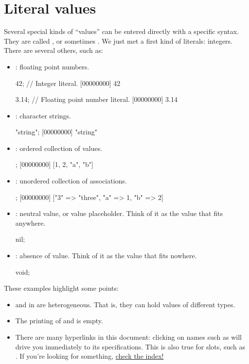 \section{Literal values}

Several special kinds of ``values'' can be entered directly with a specific
syntax.  They are called , or sometimes .
We just met a first kind of literals: integers.  There are several others,
such as:

\begin{itemize}
\item {}: floating point numbers.
\begin{urbiscript}
42; // Integer literal.
[00000000] 42

3.14; // Floating point number literal.
[00000000] 3.14
\end{urbiscript}

\item {}: character strings.
\begin{urbiscript}
"string";
[00000000] "string"
\end{urbiscript}

\item {}: ordered collection of values.
\begin{urbiscript}
[1, 2, "a", "b"];
[00000000] [1, 2, "a", "b"]
\end{urbiscript}

\item {}: unordered collection of
  associations.
\begin{urbiscript}
["a" => 1, "b" => 2, "3" => "three"];
[00000000] ["3" => "three", "a" => 1, "b" => 2]
\end{urbiscript}

\item {}: neutral value, or value placeholder. Think of it as
  the value that fits anywhere.
\begin{urbiscript}
nil;
\end{urbiscript}

\item {}: absence of value. Think of it as the value that fits
  nowhere.
\begin{urbiscript}
void;
\end{urbiscript}
\end{itemize}

These examples highlight some points:
\begin{itemize}
\item {} and  in
  \us are heterogeneous. That is, they can hold values of different types.
\item The printing of  and  is empty.
\item There are many hyperlinks in this document: clicking on names such as
   will drive you immediately to its specifications.
  This is also true for slots, such as .  If you're
  looking for something, \hyperref[sec:index]{check the index!}
\end{itemize}

